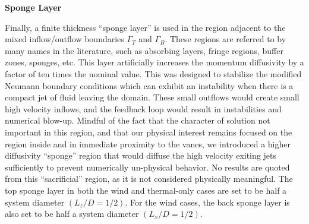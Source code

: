 \textbf{Sponge Layer} 

Finally, a finite thickness ``sponge layer'' is used in the region adjacent 
to the mixed inflow/outflow boundaries $\Gamma_T$ and $\Gamma_B$.
These regions are referred to by many names in the
literature\cite{doi:10.1146/annurev.fluid.36.050802.121930}, such as
absorbing layers, fringe regions, buffer zones, sponges,
etc. 
This layer artificially increases the momentum diffusivity by
a factor of ten times the nominal value. This was designed to stabilize
the modified Neumann boundary conditions which can exhibit an instability
when there is a compact jet of fluid leaving the domain. 
These small outflows would create small high velocity inflows, and the
feedback loop would result in instabilities and numerical
blow-up. Mindful of the fact that the character of solution not
important in this region, and that our physical interest remains focused
on the region inside and in immediate proximity to the vanes, we
introduced a higher diffusivity ``sponge'' region that would diffuse the
high velocity exiting jets sufficiently to prevent numerically
un-physical behavior. No results are quoted from this ``sacrificial''
region, as it is not considered physically meaningful. The top sponge
layer in both the wind and thermal-only cases are set to be half a
system diameter $(L_z/D = 1/2)$. For the wind cases, the back sponge
layer is also set to be half a system diameter $(L_x/D = 1/2)$. 

